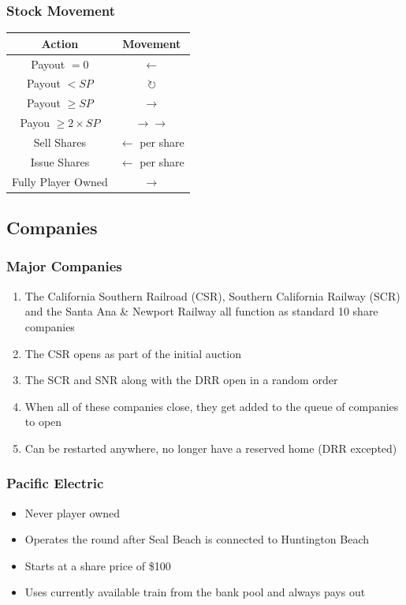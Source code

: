 \documentclass[letterpaper]{article}
\begin{document}
\begin{multicols}{2}
    \subsubsection*{Stock Movement}
    \begin{tabular}{c|c}
      \hline
      \textbf{Action} & \textbf{Movement} \\
      \hline
      \hline
      Payout $= 0$ & $\leftarrow$ \\
      Payout $< SP$ & $\circlearrowright$ \\
      Payout $\geq SP$ & $\rightarrow$ \\
      Payou $\geq 2 \times SP$ & $\rightarrow\rightarrow$ \\
      \hline
      Sell Shares & $\leftarrow$ per share \\
      Issue Shares & $\leftarrow$ per share \\
      Fully Player Owned & $\rightarrow$ \\
      \hline
    \end{tabular}

    \subsection*{Companies}

    \subsubsection*{Major Companies}
    \begin{enumerate}
    \item The California Southern Railroad (CSR), Southern California Railway (SCR)
    and the Santa Ana \& Newport Railway all function as standard 10 share
    companies
    \item The CSR opens as part of the initial auction
    \item The SCR and SNR along with the DRR open in a random order
    \item When all of these companies close, they get added to the queue of companies to open
    \item Can be restarted anywhere, no longer have a reserved home (DRR excepted)
    \end{enumerate}

    \subsubsection*{Pacific Electric}
    \begin{itemize}
    \item Never player owned
    \item Operates the round after Seal Beach is connected to Huntington Beach
    \item Starts at a share price of \$100
    \item Uses currently available train from the bank pool and always pays out
    \end{itemize}

\end{multicols}
\end{document}
